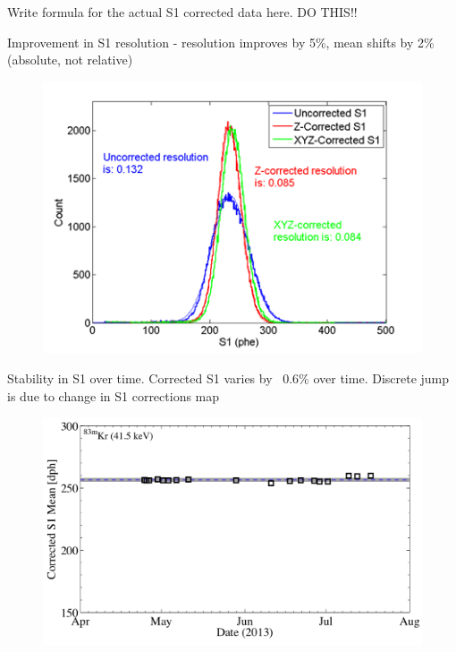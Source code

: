 \documentclass[a4paper,12pt]{article}
\begin{document}
{Write formula for the actual S1 corrected data here. DO THIS!!

Improvement in S1 resolution - resolution improves by 5\%, mean shifts by 2\% (absolute, not relative)

\begin{figure} [!h]
\includegraphics[scale=.75]{KRS1_ResolutionImprovement.png} 
\label{KrS1Improvement}
\end{figure}


Stability in S1 over time. Corrected S1 varies by ~0.6\% over time.  Discrete jump is due to change in S1 corrections map

\begin{figure} [!h]
\includegraphics[scale=.35]{CorrectedS1_Stability.png} 
\label{KrS2Stability}
\end{figure}

}
\end{document}
